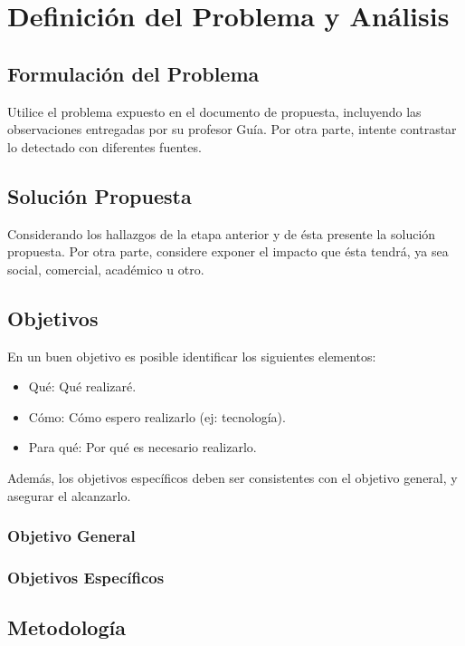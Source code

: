 \chapter{Definición del Problema y Análisis}

\section{Formulación del Problema}

Utilice el problema expuesto en el documento de propuesta, incluyendo las observaciones entregadas por su profesor Guía. Por otra parte, intente contrastar lo detectado con diferentes fuentes. 

\section{Solución Propuesta}

Considerando los hallazgos de la etapa anterior y de ésta presente la solución propuesta. Por otra parte, considere exponer el impacto que ésta tendrá, ya sea social, comercial, académico u otro. 

\section{Objetivos}
En un buen objetivo es posible identificar los siguientes elementos:
\begin{itemize}
    \item Qué: Qué realizaré. 
    \item Cómo: Cómo espero realizarlo (ej: tecnología). 
    \item Para qué: Por qué es necesario realizarlo. 
\end{itemize}

Además, los objetivos específicos deben ser consistentes con el objetivo general, y asegurar el alcanzarlo.

\subsection{Objetivo General}
\label{sc:OG}

\subsection{Objetivos Específicos}
\label{ssc:OE}

\section{Metodología}
\label{sc:Met}

